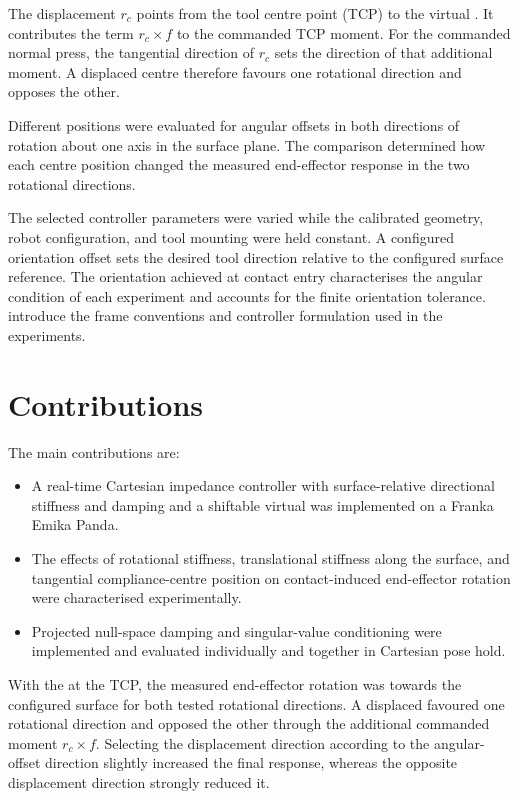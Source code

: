 The displacement \mbox{\(r_c\)} points from the tool centre point (TCP) to the
virtual . It contributes the term \mbox{\(r_c\times f\)} to the commanded
TCP moment. For the commanded normal press, the tangential direction of
\mbox{\(r_c\)} sets the direction of that additional moment. A displaced
centre therefore favours one rotational direction and opposes the other.

Different  positions were evaluated for angular offsets in
both directions of rotation about one axis in the surface plane. The comparison determined how
each centre position changed the measured end-effector response in the two
rotational directions.

The selected controller parameters were varied while the calibrated geometry,
robot configuration, and tool mounting were held constant. A configured
orientation offset sets the desired tool direction relative to the configured
surface reference. The orientation achieved at contact entry characterises the
angular condition of each experiment and accounts for the finite
orientation tolerance. \mbox{} introduce the
frame conventions and controller formulation used in the experiments.

\section{Contributions}
\label{sec:objectives}

The main contributions are:

\begin{itemize}[leftmargin=1.1cm]
\item A real-time Cartesian impedance controller with surface-relative
directional stiffness and damping and a shiftable virtual  was implemented on a
Franka Emika Panda.
\item The effects of rotational stiffness, translational stiffness along the
surface, and tangential compliance-centre position on contact-induced
end-effector rotation were characterised experimentally.
\item Projected null-space damping and singular-value conditioning were
implemented and evaluated individually and together in Cartesian pose hold.
\end{itemize}

With the  at the TCP, the measured end-effector rotation was towards
the configured surface for both tested rotational directions. A displaced
 favoured one rotational direction and opposed the other through the
additional commanded moment \mbox{\(r_c\times f\)}. Selecting the displacement
direction according to the angular-offset direction slightly increased
the final response, whereas the opposite displacement direction strongly
reduced it.